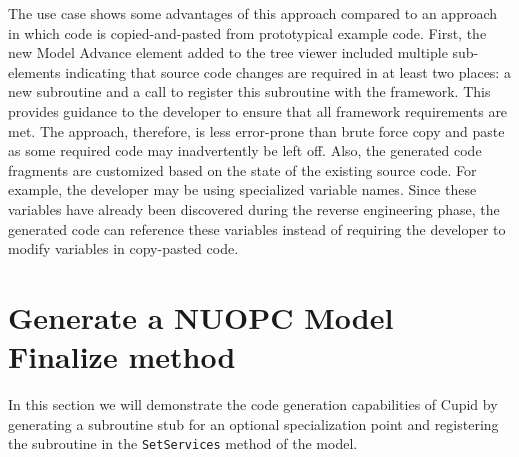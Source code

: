 \documentclass[oneside,11pt]{memoir}
\begin{document}
The use case shows some advantages of this approach compared to an approach in which code is copied-and-pasted from prototypical example code. First, the new Model Advance element added to the tree viewer included multiple sub-elements indicating that source code changes are required in at least two places: a new subroutine and a call to register this subroutine with the framework.  This provides guidance to the developer to ensure that all framework requirements are met. The approach, therefore, is less error-prone than brute force copy and paste as some required code may inadvertently be left off. Also, the generated code fragments are customized based on the state of the existing source code. For example, the developer may be using specialized variable names. Since these variables have already been discovered during the reverse engineering phase, the generated code can reference these variables instead of requiring the developer to modify variables in copy-pasted code.

\section {Generate a NUOPC Model Finalize method}

In this section we will demonstrate the code generation capabilities of Cupid by generating a subroutine stub for an optional specialization point and registering the subroutine in the \texttt{SetServices} method of the model.
\end{document}
